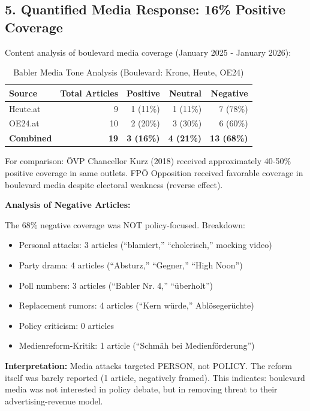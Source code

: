 \subsection*{5. Quantified Media Response: 16\% Positive Coverage}

Content analysis of boulevard media coverage (January 2025 - January 2026):

\begin{table}[h]
\centering
\caption{Babler Media Tone Analysis (Boulevard: Krone, Heute, OE24)}
\label{tab:dx-media-tone}
\begin{tabular}{|l|r|r|r|r|}
\hline
\textbf{Source} & \textbf{Total Articles} & \textbf{Positive} & \textbf{Neutral} & \textbf{Negative} \\
\hline
Heute.at & 9 & 1 (11\%) & 1 (11\%) & 7 (78\%) \\
OE24.at & 10 & 2 (20\%) & 3 (30\%) & 6 (60\%) \\
\hline
\textbf{Combined} & \textbf{19} & \textbf{3 (16\%)} & \textbf{4 (21\%)} & \textbf{13 (68\%)} \\
\hline
\end{tabular}
\end{table}

For comparison: ÖVP Chancellor Kurz (2018) received approximately 40-50\% positive
coverage in same outlets. FPÖ Opposition received favorable coverage in boulevard
media despite electoral weakness (reverse effect).

\textbf{Analysis of Negative Articles:}

The 68\% negative coverage was NOT policy-focused. Breakdown:

\begin{itemize}
\item Personal attacks: 3 articles (``blamiert,'' ``cholerisch,'' mocking video)
\item Party drama: 4 articles (``Absturz,'' ``Gegner,'' ``High Noon'')
\item Poll numbers: 3 articles (``Babler Nr. 4,'' ``überholt'')
\item Replacement rumors: 4 articles (``Kern würde,'' Ablösegerüchte)
\item Policy criticism: 0 articles
\item Medienreform-Kritik: 1 article (``Schmäh bei Medienförderung'')
\end{itemize}

\textbf{Interpretation:} Media attacks targeted PERSON, not POLICY. The reform
itself was barely reported (1 article, negatively framed). This indicates:
boulevard media was not interested in policy debate, but in removing threat
to their advertising-revenue model.

